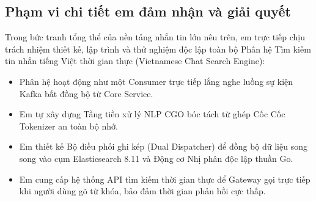 \documentclass[12pt,a4paper,oneside]{report}
\begin{document}
\subsection{Phạm vi chi tiết em đảm nhận và giải quyết}
Trong bức tranh tổng thể của nền tảng nhắn tin lớn nêu trên, em trực tiếp chịu trách nhiệm thiết kế, lập trình và thử nghiệm độc lập toàn bộ Phân hệ Tìm kiếm tin nhắn tiếng Việt thời gian thực (Vietnamese Chat Search Engine):
\begin{itemize}
    \item Phân hệ hoạt động như một Consumer trực tiếp lắng nghe luồng sự kiện Kafka bất đồng bộ từ Core Service.
    \item Em tự xây dựng Tầng tiền xử lý NLP CGO bóc tách từ ghép Cốc Cốc Tokenizer an toàn bộ nhớ.
    \item Em thiết kế Bộ điều phối ghi kép (Dual Dispatcher) để đồng bộ dữ liệu song song vào cụm Elasticsearch 8.11 và Động cơ Nhị phân độc lập thuần Go.
    \item Em cung cấp hệ thống API tìm kiếm thời gian thực để Gateway gọi trực tiếp khi người dùng gõ từ khóa, bảo đảm thời gian phản hồi cực thấp.
\end{itemize}
\end{document}
